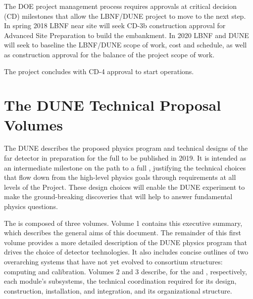 The DOE project management process requires approvals at critical decision (CD) milestones that allow the LBNF/DUNE project to move to the next step. In spring 2018 LBNF near site  will seek CD-3b construction approval for Advanced Site Preparation to build the embankment. In 2020 LBNF and DUNE will seek to baseline the LBNF/DUNE scope of work, cost and schedule, as well as construction approval for the balance of the project scope of work. 

The project concludes with CD-4 approval to start operations.


\section{The DUNE Technical Proposal Volumes}


The DUNE  describes the proposed physics program and 
technical designs of the far detector in preparation for the full  
to be published in 2019.  
It is intended as an intermediate
milestone on the path to a full , justifying the technical choices that flow down from the high-level physics goals through requirements at all levels of the Project. These design choices will enable the DUNE experiment to make the ground-breaking discoveries that will help to  answer %
fundamental physics questions.

The   is composed of three volumes. Volume 1 contains this executive summary, which describes 
the general aims of this document. The remainder of this first volume provides a more detailed description of the DUNE physics program that drives the choice of detector technologies. It also includes concise outlines of two overarching systems that have not yet evolved to consortium structures:  computing and calibration. 
Volumes 2  and 3 describe, for the \single and \dual, %
respectively, each module's subsystems, the technical coordination required for its design, construction, installation, and integration, and its organizational structure.



